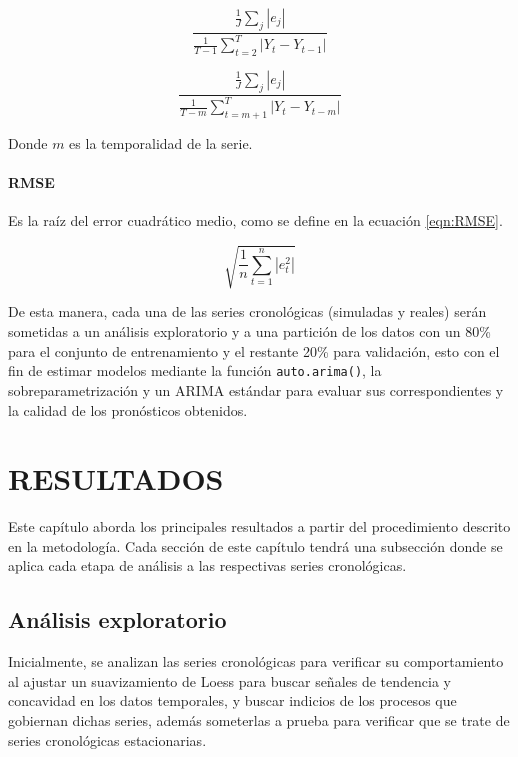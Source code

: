 \documentclass[
]{article}
\begin{document}
\begin{equation}
\label{eqn:MASE_no}
\frac{\frac{1}{J}\sum_j|e_j|}{\frac{1}{T-1}\sum_{t=2}^T|Y_t-Y_{t-1}|}
\end{equation}

\begin{equation}
\label{eqn:MASE_si}
\frac{\frac{1}{J}\sum_j|e_j|}{\frac{1}{T-m}\sum_{t=m+1}^T|Y_t-Y_{t-m}|}
\end{equation}

Donde \(m\) es la temporalidad de la serie.

\paragraph{RMSE}

Es la raíz del error cuadrático medio, como se define en la ecuación
\ref{eqn:RMSE}.

\begin{equation}
\label{eqn:RMSE}
\sqrt{\frac{1}{n}\sum_{t=1}^n |e_t^2|}
\end{equation}

De esta manera, cada una de las series cronológicas (simuladas y reales)
serán sometidas a un análisis exploratorio y a una partición de los
datos con un 80\% para el conjunto de entrenamiento y el restante 20\%
para validación, esto con el fin de estimar modelos mediante la función
\texttt{auto.arima()}, la sobreparametrización y un ARIMA estándar para
evaluar sus correspondientes y la calidad de los pronósticos obtenidos.

\newpage

\section{RESULTADOS}

Este capítulo aborda los principales resultados a partir del
procedimiento descrito en la metodología. Cada sección de este capítulo
tendrá una subsección donde se aplica cada etapa de análisis a las
respectivas series cronológicas.

\subsection{Análisis exploratorio}

Inicialmente, se analizan las series cronológicas para verificar su
comportamiento al ajustar un suavizamiento de Loess para buscar señales
de tendencia y concavidad en los datos temporales, y buscar indicios de
los procesos que gobiernan dichas series, además someterlas a prueba
para verificar que se trate de series cronológicas estacionarias.
\end{document}
